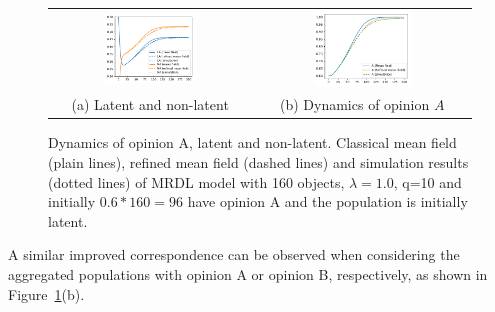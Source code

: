 \documentclass{elsarticle}
\begin{document}
\begin{figure}[ht]
\begin{center}
  \begin{tabular}{cc}
    \includegraphics[width=0.47\textwidth]{MajorityRule_LANA_N160}
    &\includegraphics[width=0.47\textwidth]{MajorityRule_A_N160}\\
    (a) Latent and non-latent & (b) Dynamics of opinion $A$
  \end{tabular}
\end{center}
\caption{\label{fig:mrdl_06_160} Dynamics of opinion A, latent and
  non-latent. Classical mean field (plain lines), refined mean field
  (dashed lines) and simulation results (dotted lines) of MRDL model
  with 160 objects, $\lambda=1.0$, q=10 and initially $0.6*160=96$
  have opinion A and the population is initially latent. }
\end{figure}

A similar improved correspondence can be observed when considering the
aggregated populations with opinion A or opinion B, respectively, as
shown in Figure~\ref{fig:mrdl_06_160}(b).

\end{document}
